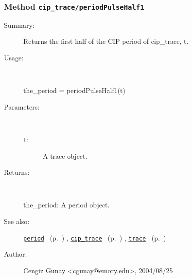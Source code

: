 \subsubsection[Method \texttt{periodPulseHalf1}]{Method \texttt{cip\_trace/periodPulseHalf1}}%
%
\label{ref_cip_trace__periodPulseHalf1}%
\hypertarget{ref_cip_trace__periodPulseHalf1}{}%
\begin{description}
\item[Summary:]Returns the first half of the CIP period of cip\_trace, t. 
%
\item[Usage:]~%
\begin{lyxcode}%
the\_period = periodPulseHalf1(t)
%
\end{lyxcode}%
%
%
\item[Parameters:]~
\begin{description}%
\item[\texttt{t}:]
 A trace object.
\end{description}%
%
\item[Returns:
]~

	the\_period: A period object.
%
%
\item[See also:]%
\hyperlink{ref_period}{\texttt{period}}%
\ (p.~\pageref{ref_period})%
%
, \hyperlink{ref_cip_trace}{\texttt{cip\_trace}}%
\ (p.~\pageref{ref_cip_trace})%
%
, \hyperlink{ref_trace}{\texttt{trace}}%
\ (p.~\pageref{ref_trace})%
%
%
\item[Author:]%
Cengiz Gunay <cgunay@emory.edu>, 2004/08/25
%
\end{description}
\methodline%
